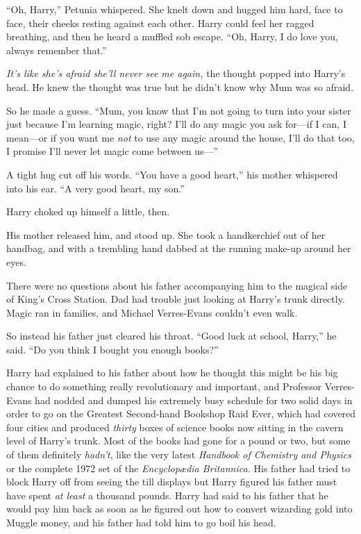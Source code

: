 “Oh, Harry,” Petunia whispered. She knelt down and hugged him hard, face to face, their cheeks resting against each other. Harry could feel her ragged breathing, and then he heard a muffled sob escape. “Oh, Harry, I do love you, always remember that.”

\emph{It’s like she’s afraid she’ll never see me again,} the thought popped into Harry’s head. He knew the thought was true but he didn’t know why Mum was so afraid.

So he made a guess. “Mum, you know that I’m not going to turn into your sister just because I’m learning magic, right? I’ll do any magic you ask for—if I can, I mean—or if you want me \emph{not} to use any magic around the house, I’ll do that too, I promise I’ll never let magic come between us—”

A tight hug cut off his words. “You have a good heart,” his mother whispered into his ear. “A very good heart, my son.”

Harry choked up himself a little, then.

His mother released him, and stood up. She took a handkerchief out of her handbag, and with a trembling hand dabbed at the running make-up around her eyes.

There were no questions about his father accompanying him to the magical side of King’s Cross Station. Dad had trouble just looking at Harry’s trunk directly. Magic ran in families, and Michael Verres-Evans couldn’t even walk.

So instead his father just cleared his throat. “Good luck at school, Harry,” he said. “Do you think I bought you enough books?”

Harry had explained to his father about how he thought this might be his big chance to do something really revolutionary and important, and Professor Verres-Evans had nodded and dumped his extremely busy schedule for two solid days in order to go on the Greatest Second-hand Bookshop Raid Ever, which had covered four cities and produced \emph{thirty} boxes of science books now sitting in the cavern level of Harry’s trunk. Most of the books had gone for a pound or two, but some of them definitely \emph{hadn’t}, like the very latest \emph{Handbook of Chemistry and Physics} or the complete 1972 set of the \emph{Encyclopædia Britannica.} His father had tried to block Harry off from seeing the till displays but Harry figured his father must have spent \emph{at least} a thousand pounds. Harry had said to his father that he would pay him back as soon as he figured out how to convert wizarding gold into Muggle money, and his father had told him to go boil his head.

